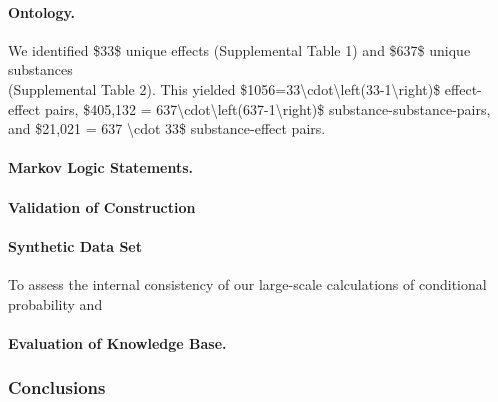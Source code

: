 \documentclass[
]{article}
\begin{document}
\hypertarget{header-n28}{%
\paragraph{\texorpdfstring{Ontology. }{Ontology. }}\label{header-n28}}

We identified \$33\$ unique effects (Supplemental Table 1) and \$637\$
unique substances \\
(Supplemental Table 2). This yielded
\$1056=33\textbackslash cdot\textbackslash left(33-1\textbackslash right)\$
effect-effect pairs, \$405,132 =
637\textbackslash cdot\textbackslash left(637-1\textbackslash right)\$
substance-substance-pairs, and \$21,021 = 637 \textbackslash cdot 33\$
substance-effect pairs.

\hypertarget{header-n30}{%
\paragraph{Markov Logic Statements.}\label{header-n30}}

\hypertarget{header-n32}{%
\paragraph{\texorpdfstring{Validation of Construction
}{Validation of Construction }}\label{header-n32}}

\hypertarget{header-n33}{%
\paragraph{Synthetic Data Set}\label{header-n33}}

To assess the internal consistency of our large-scale calculations of
conditional probability and

\hypertarget{header-n37}{%
\paragraph{Evaluation of Knowledge Base.}\label{header-n37}}

\hypertarget{header-n38}{%
\paragraph{\texorpdfstring{ }{ }}\label{header-n38}}

\hypertarget{header-n40}{%
\subsubsection{Conclusions}\label{header-n40}}
\end{document}
